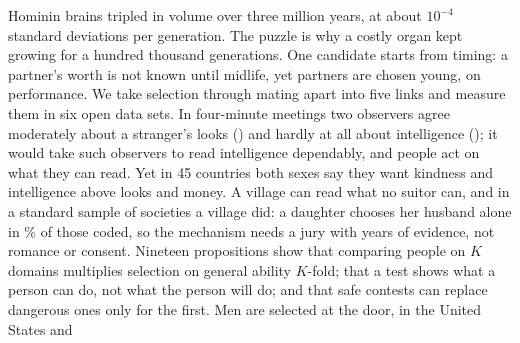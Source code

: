 \documentclass[9pt,twocolumn,letterpaper]{extarticle}
\theoremstyle{pbo}
\theoremstyle{pbor}
\begin{document}
\onecolumn
\thispagestyle{empty}
\begingroup
{}\par
\vspace{5pt}
\vspace{4pt}
\vspace{2pt}
\vspace{4pt}
\vspace{2pt}
\noindent{\color{rulegray}\rule{\textwidth}{0.5pt}}\par
\vspace{2pt}
\;
Hominin brains tripled in volume over three million years, at about $10^{-4}$ standard deviations per generation. The
puzzle is why a costly organ kept growing for a hundred thousand generations. One candidate starts from timing: a
partner's worth is not known until midlife, yet partners are chosen young, on performance. We take selection
through mating apart into five links and measure them in six open data sets. In \SdRows{} four-minute meetings two
observers agree moderately about a stranger's looks (\JurOneAtt) and hardly at all about intelligence (\JurOneInt); it
would take \JurKInt{} such observers to read intelligence dependably, and people act on what they can read. Yet in 45
countries both sexes say they want kindness and intelligence above looks and money. A village can read what no suitor
can, and in a standard sample of \CcSccsN{} societies a village did: a daughter chooses her husband alone in \CcAloneW\%
of those coded, so the mechanism needs a jury with years of evidence, not romance or consent. Nineteen propositions show that comparing people on
$K$ domains multiplies selection on general ability $K$-fold; that a test shows what a person can do, not what the person
will do; and that safe contests can replace dangerous ones only for the first. Men are selected at the door, in the United States and
\end{document}
